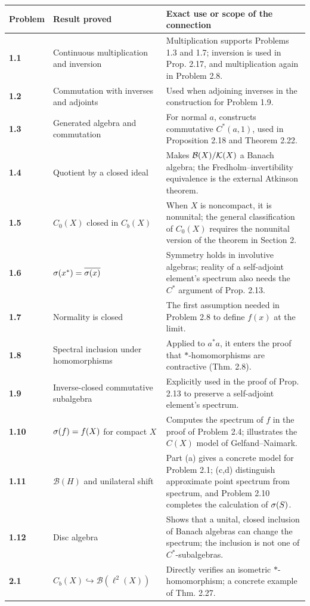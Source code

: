 \small
\begin{longtable}{>{\bfseries}p{1.3cm}p{4.3cm}p{8.2cm}}
\toprule
Problem & Result proved & Exact use or scope of the connection\\
\midrule
\endhead
1.1 & Continuous multiplication and inversion & Multiplication supports Problems 1.3 and 1.7; inversion is used in Prop. 2.17, and multiplication again in Problem 2.8.\\
1.2 & Commutation with inverses and adjoints & Used when adjoining inverses in the construction for Problem 1.9.\\
1.3 & Generated algebra and commutation & For normal $a$, constructs commutative $C^*(a,1)$, used in Proposition 2.18 and Theorem 2.22.\\
1.4 & Quotient by a closed ideal & Makes $\mathcal B(X)/\mathcal K(X)$ a Banach algebra; the Fredholm--invertibility equivalence is the external Atkinson theorem.\\
1.5 & $C_0(X)$ closed in $C_b(X)$ & When $X$ is noncompact, it is nonunital; the general classification of $C_0(X)$ requires the nonunital version of the theorem in Section 2.\\
1.6 & $\sigma(x^*)=\overline{\sigma(x)}$ & Symmetry holds in involutive algebras; reality of a self-adjoint element's spectrum also needs the $C^*$ argument of Prop. 2.13.\\
1.7 & Normality is closed & The first assumption needed in Problem 2.8 to define $f(x)$ at the limit.\\
1.8 & Spectral inclusion under homomorphisms & Applied to $a^*a$, it enters the proof that $*$-homomorphisms are contractive (Thm. 2.8).\\
1.9 & Inverse-closed commutative subalgebra & Explicitly used in the proof of Prop. 2.13 to preserve a self-adjoint element's spectrum.\\
1.10 & $\sigma(f)=f(X)$ for compact $X$ & Computes the spectrum of $f$ in the proof of Problem 2.4; illustrates the $C(X)$ model of Gelfand--Naimark.\\
1.11 & $\mathcal B(H)$ and unilateral shift & Part (a) gives a concrete model for Problem 2.1; (c,d) distinguish approximate point spectrum from spectrum, and Problem 2.10 completes the calculation of $\sigma(S)$.\\
1.12 & Disc algebra & Shows that a unital, closed inclusion of Banach algebras can change the spectrum; the inclusion is not one of $C^*$-subalgebras.\\
\midrule
2.1 & $C_b(X)\hookrightarrow\mathcal B(\ell^2(X))$ & Directly verifies an isometric $*$-homomorphism; a concrete example of Thm. 2.27.\\

\end{longtable}
